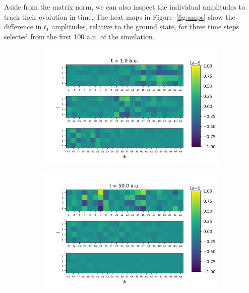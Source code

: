 Aside from the matrix norm, we can also inspect the individual amplitudes to track
their evolution in time. The heat maps in Figure~\ref{fig:amps} show the difference 
in $t_1$ amplitudes, relative to the ground state, for three time steps selected 
from the first 100 a.u. of the simulation.
\begin{figure}
    \begin{subfigure}{.5\textwidth}
        \centering
        \includegraphics[scale=0.5]{p3/figures/MO_delta_t1_1.png}
        \caption{}
        \label{fig:MO_t1_1}
    \end{subfigure}%
    \begin{subfigure}{.5\textwidth}
        \centering
        \includegraphics[scale=0.5]{p3/figures/MO_delta_t1_50.png}
        \caption{}
        \label{fig:MO_t1_50}
    \end{subfigure}
    \begin{subfigure}{.5\textwidth}

\end{subfigure}
\end{figure}
